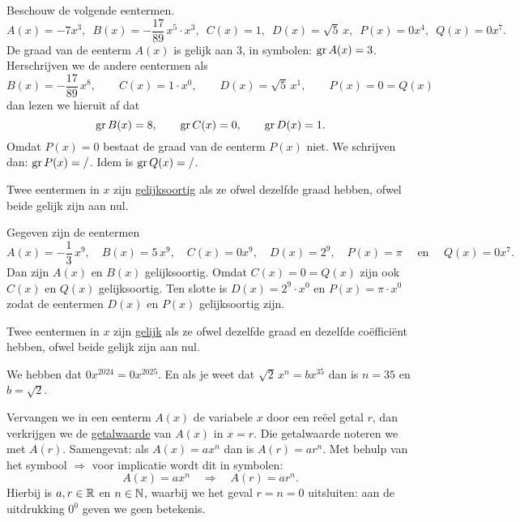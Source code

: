 \documentclass{ximera}
\begin{document}
\begin{example} 
Beschouw de volgende eentermen.
\[
A(x) = -7x^3, \,\,\, B(x) = -\frac{17}{89}\,x^5\cdot x^3, \,\,\, C(x) = 1, \,\,\, D(x) = \sqrt{5}\,x, \,\,\, P(x) = 0 x^4, \,\,\,  Q(x) = 0 x^7.
\]
De graad van de eenterm $A(x)$ is gelijk aan $3$, in symbolen: $\operatorname{gr} A(x) = 3$. Herschrijven we de andere eentermen als
\[
B(x) = -\frac{17}{89}\,x^8, \qquad C(x) = 1\cdot x^0, \qquad D(x) = \sqrt{5}\,x^1, \qquad P(x) = 0 = Q(x)
\]
dan lezen we hieruit af dat 
\[
\operatorname{gr} B(x) = 8, \qquad \operatorname{gr} C(x) = 0, \qquad \operatorname{gr} D(x) = 1. 
\]
Omdat $P(x) = 0$ bestaat de graad van de eenterm $P(x)$ niet. We schrijven dan: $\operatorname{gr} P(x) = /$. Idem is $\operatorname{gr} Q(x) = /$.
\end{example} 

Twee eentermen in $x$ zijn \underline{gelijksoortig} als ze ofwel dezelfde graad hebben, ofwel beide gelijk zijn aan nul.

\begin{example} 
Gegeven zijn de eentermen
\[
A(x) = -\frac{1}{3}\,x^9, \quad B(x) = 5\,x^9, \quad C(x) = 0x^9, \quad D(x) = 2^9, \quad P(x) = \pi \quad \text{ en } \quad Q(x) = 0 x^7.
\]
Dan zijn $A(x)$ en $B(x)$ gelijksoortig. Omdat $C(x) = 0 = Q(x)$ zijn ook $C(x)$ en $Q(x)$ gelijksoortig. Ten slotte is $D(x) = 2^9 \cdot x^0$ en $P(x) = \pi \cdot x^0$ zodat de eentermen $D(x)$ en $P(x)$ gelijksoortig zijn.  
\end{example} 

Twee eentermen in $x$ zijn \underline{gelijk} als ze ofwel dezelfde graad en dezelfde co\"effici\"ent hebben, ofwel beide gelijk zijn aan nul.

\begin{example} 
We hebben dat $0x^{2024} = 0x^{2025}$. En als je weet dat $\sqrt{2}\,x^n = bx^{35}$ dan is $n = 35$ en $b = \sqrt{2}$.
\end{example} 



Vervangen we in een eenterm $A(x)$ de variabele $x$ door een re\"eel getal $r$, dan verkrijgen we de \underline{getalwaarde} van $A(x)$ in $x = r$. Die getalwaarde noteren we met $A(r)$. Samengevat: als $A(x) = ax^n$ dan is $A(r) = ar^n$. Met behulp van het symbool $\Rightarrow$ voor implicatie wordt dit in symbolen:
\[
A(x) = ax^n \quad \Rightarrow \quad A(r) = a r^n.
\]
Hierbij is $a,r \in \mathbb{R}$ en $n \in \mathbb{N}$, waarbij we het geval $r = n = 0$ uitsluiten: aan de uitdrukking $0^0$ geven we geen betekenis.
\end{document}
